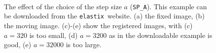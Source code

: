 \documentclass[]{report}
\newcommand{\elastix}{\texttt{elastix}}
\begin{document}
\begin{figure}[tb]
\centering
{}\label{sfig:stepsize:fixed}
\label{sfig:stepsize:moving} \\
\label{sfig:stepsize:a320}
\label{sfig:stepsize:a3200}
\label{sfig:stepsize:a32000}
\caption{The effect of the choice of the step size $a$
(\texttt{SP\_A}). This example can be downloaded from the
\elastix\ website. (a) the fixed image, (b) the moving image.
(c)-(e) show the registered images, with (c) $a = 320$ is too
small, (d) $a = 3200$ as in the downloadable example is good, (e)
$a = 32000$ is too large.} \label{fig:stepsize}
\end{figure}
\end{document}

